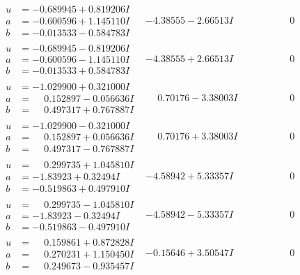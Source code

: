 \documentclass[1p]{elsarticle_modified}
\theoremstyle{definition}
\begin{document}
$$\begin{array}{c|c|c}
\begin{aligned}
u &= -0.689945 + 0.819206 I \\
a &= -0.600596 + 1.145110 I \\
b &= -0.013533 - 0.584783 I\end{aligned}
 & -4.38555 - 2.66513 I & \phantom{-0.000000 } 0 \\ \hline\begin{aligned}
u &= -0.689945 - 0.819206 I \\
a &= -0.600596 - 1.145110 I \\
b &= -0.013533 + 0.584783 I\end{aligned}
 & -4.38555 + 2.66513 I & \phantom{-0.000000 } 0 \\ \hline\begin{aligned}
u &= -1.029900 + 0.321000 I \\
a &= \phantom{-}0.152897 - 0.056636 I \\
b &= \phantom{-}0.497317 + 0.767887 I\end{aligned}
 & \phantom{-}0.70176 - 3.38003 I & \phantom{-0.000000 } 0 \\ \hline\begin{aligned}
u &= -1.029900 - 0.321000 I \\
a &= \phantom{-}0.152897 + 0.056636 I \\
b &= \phantom{-}0.497317 - 0.767887 I\end{aligned}
 & \phantom{-}0.70176 + 3.38003 I & \phantom{-0.000000 } 0 \\ \hline\begin{aligned}
u &= \phantom{-}0.299735 + 1.045810 I \\
a &= -1.83923 + 0.32494 I \\
b &= -0.519863 + 0.497910 I\end{aligned}
 & -4.58942 + 5.33357 I & \phantom{-0.000000 } 0 \\ \hline\begin{aligned}
u &= \phantom{-}0.299735 - 1.045810 I \\
a &= -1.83923 - 0.32494 I \\
b &= -0.519863 - 0.497910 I\end{aligned}
 & -4.58942 - 5.33357 I & \phantom{-0.000000 } 0 \\ \hline\begin{aligned}
u &= \phantom{-}0.159861 + 0.872828 I \\
a &= \phantom{-}0.270231 + 1.150450 I \\
b &= \phantom{-}0.249673 - 0.935457 I\end{aligned}
 & -0.15646 + 3.50547 I & \phantom{-0.000000 } 0 \\ \hline\begin{aligned}

\end{aligned}
\end{array}$$
\end{document}
